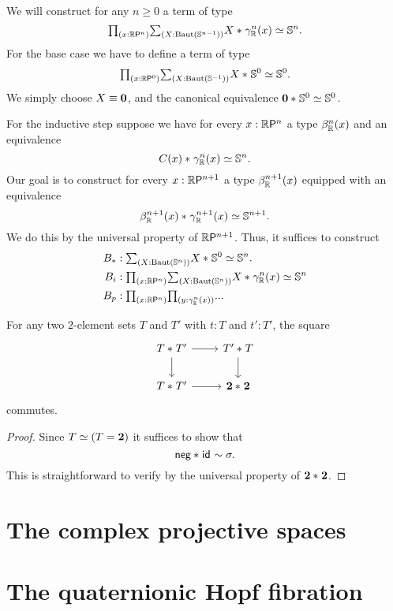 \begin{constr}
We will construct for any $n\geq 0$ a term of type
\begin{equation*}
\prd{x:\rprojective{n}} \sm{X:\BAut(\sphere{n-1})} \eqv{\join{X}{\tautfam[\R]{n}(x)}}{\sphere{n}}.
\end{equation*}
For the base case we have to define a term of type
\begin{equation*}
\prd{x:\rprojective{0}} \sm{X:\BAut(\sphere{-1})} \eqv{\join{X}{\sphere{0}}}{\sphere{0}}.
\end{equation*}
We simply choose $X\jdeq \emptyt$, and the canonical equivalence $\eqv{\join{\emptyt}{\sphere{0}}}{\sphere{0}}$. 

For the inductive step suppose we have for every $x:\rprojective{n}$ a type $\orthcomp[\R]{n}(x)$ and an equivalence
\begin{equation*}
\eqv{\join{C(x)}{\tautfam[\R]{n}(x)}}{\sphere{n}}.
\end{equation*}
Our goal is to construct for every $x:\rprojective{n+1}$ a type $\orthcomp[\mathbb{R}]{n+1}(x)$ equipped with an equivalence
\begin{equation*}
\eqv{\join{\orthcomp[\mathbb{R}]{n+1}(x)}{\tautfam[\R]{n+1}(x)}}{\sphere{n+1}}.
\end{equation*}
We do this by the universal property of $\rprojective{n+1}$. Thus, it suffices to construct
\begin{align*}
B_{\pt} & : \sm{X:\BAut(\sphere{n})}\eqv{\join{X}{\sphere{0}}}{\sphere{n}}.\\
B_i & : \prd{x:\rprojective{n}}\sm{X:\BAut(\sphere{n})}\eqv{\join{X}{\tautfam[\R]{n}(x)}}{\sphere{n}} \\
B_p & : \prd{x:\rprojective{n}}{y:\tautfam[\R]{n}(x)} ... 
\end{align*}
\end{constr}

\begin{lem}
For any two $2$-element sets $T$ and $T'$ with $t:T$ and $t':T'$, the square
\begin{equation*}
\begin{tikzcd}
\join{T}{T'} \arrow[r] \arrow[d] & \join{T'}{T} \arrow[d] \\
\join{T}{T'} \arrow[r] & \join{\bool}{\bool}
\end{tikzcd}
\end{equation*}
commutes.
\end{lem}

\begin{proof}
Since $\eqv{T}{(T=\bool)}$ it suffices to show that
\begin{equation*}
\join{\mathsf{neg}}{\idfunc}\htpy \sigma.
\end{equation*}
This is straightforward to verify by the universal property of $\join{\bool}{\bool}$. 
\end{proof}
\section{The complex projective spaces}

\section{The quaternionic Hopf fibration}

